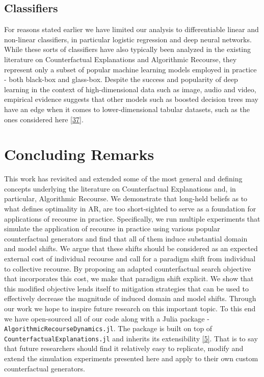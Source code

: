 \documentclass[
  conference]{IEEEtran}
\begin{document}
\hypertarget{classifiers}{%
\subsection{Classifiers}\label{classifiers}}

For reasons stated earlier we have limited our analysis to
differentiable linear and non-linear classifiers, in particular logistic
regression and deep neural networks. While these sorts of classifiers
have also typically been analyzed in the existing literature on
Counterfactual Explanations and Algorithmic Recourse, they represent
only a subset of popular machine learning models employed in practice -
both black-box and glass-box. Despite the success and popularity of deep
learning in the context of high-dimensional data such as image, audio
and video, empirical evidence suggests that other models such as boosted
decision trees may have an edge when it comes to lower-dimensional
tabular datasets, such as the ones considered here
\protect\hyperlink{ref-grinsztajn2022tree}{{[}37{]}}.

\hypertarget{sec-conclusion}{%
\section{Concluding Remarks}\label{sec-conclusion}}

This work has revisited and extended some of the most general and
defining concepts underlying the literature on Counterfactual
Explanations and, in particular, Algorithmic Recourse. We demonstrate
that long-held beliefs as to what defines optimality in AR, are too
short-sighted to serve as a foundation for applications of recourse in
practice. Specifically, we run multiple experiments that simulate the
application of recourse in practice using various popular counterfactual
generators and find that all of them induce substantial domain and model
shifts. We argue that these shifts should be considered as an expected
external cost of individual recourse and call for a paradigm shift from
individual to collective recourse. By proposing an adapted
counterfactual search objective that incorporates this cost, we make
that paradigm shift explicit. We show that this modified objective lends
itself to mitigation strategies that can be used to effectively decrease
the magnitude of induced domain and model shifts. Through our work we
hope to inspire future research on this important topic. To this end we
have open-sourced all of our code along with a Julia package -
\texttt{AlgorithmicRecourseDynamics.jl}. The package is built on top of
\texttt{CounterfactualExplanations.jl} and inherits its extensibility
\protect\hyperlink{ref-altmeyer2022CounterfactualExplanations}{{[}5{]}}.
That is to say that future researchers should find it relatively easy to
replicate, modify and extend the simulation experiments presented here
and apply to their own custom counterfactual generators.
\end{document}
